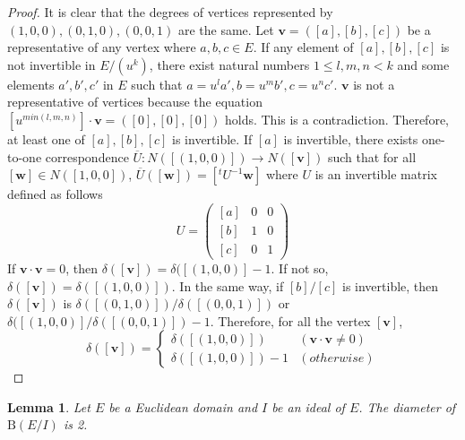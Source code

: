 \documentclass{article}
\newtheorem{Lem}{Lemma}
\newcommand{\B}{\mathrm{B}}
\begin{document}
\begin{proof}
It is clear that the degrees of vertices represented by $(1,0,0), (0,1,0), (0,0,1)$ are the same.
Let ${\bm v} = ([a],[b],[c])$ be a representative of any vertex where $a,b,c \in E$. 
If any element of $[a],[b],[c]$ is not invertible in $E/(u^k)$, 
there exist natural numbers $1 \leq l,m,n < k$ and some elements $a',b',c'$ in $E$ such that $a=u^l a', b=u^m b', c=u^n c'$. ${\bm v}$ is not a representative of vertices because the equation  $[u^{min(l,m,n)}] \cdot {\bm v} = ([0],[0],[0])$ holds. 
This is a contradiction.
Therefore, at least one of $[a],[b],[c]$ is invertible.
If $[a]$ is invertible, there exists one-to-one correspondence $\overline{U}: N([(1,0,0)])  \rightarrow N([{\bm v}])$ such that for all $[{\bm w}] \in N([1,0,0])$, $\overline{U}([\bm w]) = [ {}^t\!U^{-1} {\bm w} ]$ where $U$ is an invertible matrix defined as follows
\[
 U = \left(
 \begin{matrix}
  [a] & 0 & 0 \\
  [b] & 1 & 0 \\
  [c] & 0 & 1
 \end{matrix} \right)
\]
If ${\bm v} \cdot {\bm v} = 0$, then $\delta([\bm v]) = \delta([(1,0,0)] - 1$. If not so, $\delta([\bm v]) = \delta([(1,0,0)])$.
In the same way, if $[b]/[c]$ is invertible, then $\delta([\bm v])$ is $\delta([(0,1,0)])/\delta([(0,0,1)])$ or $\delta([(1,0,0)]/\delta([(0,0,1)]) - 1$.
Therefore, for all the vertex $[{\bm v}]$, 
\[ \delta([\bm v]) = \left\{ \begin{array}{ll}
    \delta([(1,0,0)]) & ({\bm v} \cdot {\bm v} \neq 0) \\
    \delta([(1,0,0)]) - 1 & (otherwise) 
    \end{array}\right.
\]

\end{proof}

\begin{Lem}\label{Lem:diameter}
Let $E$ be a Euclidean domain and $I$ be an ideal of $E$. The diameter of $\B(E/I)$ is 2.
\end{Lem}
\end{document}
